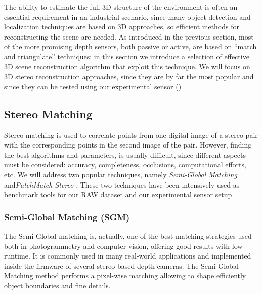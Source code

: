 The ability to estimate the full 3D structure of the environment is often an essential requirement in an industrial scenario, since many object detection and localization techniques are based on 3D approaches, so efficient methods for reconstructing the scene are needed. As introduced in the previous section, most of the more promising depth sensors, both passive or active, are based on ``match and triangulate'' techniques: in this section we introduce a selection of effective 3D scene reconstruction algorithm that exploit this technique. We will focus on 3D stereo reconstruction approaches, since they are by far the most popular and since they can be tested using our experimental sensor ()

\subsection{Stereo Matching}\label{subsec:stereomatching}
Stereo matching is used to correlate points from one digital image of a stereo pair with the corresponding points in the second image of the pair. However, finding the best algorithms and parameters, is usually difficult, since different aspects must be considered: accuracy, completeness, occlusions, computational efforts, etc. 
We will address two popular techniques, namely \emph{Semi-Global Matching} \cite{hirschmuller2005SemiGlobal} and\emph{PatchMatch Stereo} \cite{bleyer2011PatchMatchStereo}. These two techniques have been intensively used as benchmark tools for our RAW dataset and our experimental sensor setup.


\subsubsection{Semi-Global Matching (SGM)}\label{subsec:semiglobalmatching}
The Semi-Global matching is, actually, one of the best matching strategies used both in photogrammetry and computer vision, offering good results with low runtime. It is commonly used in many real-world applications and implemented inside the firmware of several stereo based depth-cameras. The Semi-Global Matching method \cite{hirschmuller2005SemiGlobal} performs a pixel-wise matching allowing to shape efficiently object boundaries and fine details. 

